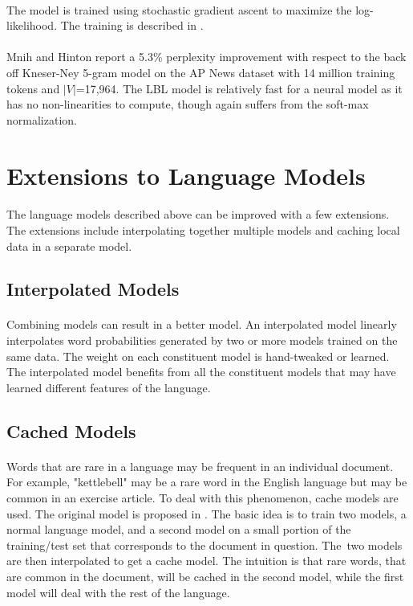 \paragraph{}
The model is trained using stochastic gradient ascent to maximize the log-likelihood. The training is described in \cite{MnihHinton2007}.
\paragraph{}
Mnih and Hinton report a 5.3\% perplexity improvement with respect to the back off Kneser-Ney 5-gram model on the AP News dataset with 14 million training tokens and $|V|$=17,964. The LBL model is relatively fast for a neural model as it has no non-linearities to compute, though again suffers from the soft-max normalization. 

\section {Extensions to Language Models}
\paragraph{}
The language models described above can be improved with a few extensions. The extensions include interpolating together multiple models and caching local data in a separate model.

\subsection{Interpolated Models}
\paragraph{}
Combining models can result in a better model. An interpolated model linearly interpolates word probabilities generated by two or more models trained on the same data. The weight on each constituent model is hand-tweaked or learned. The interpolated model benefits from all the constituent models that may have learned different features of the language.
\subsection{Cached Models}
\paragraph{}
Words that are rare in a language may be frequent in an individual document. For example, "kettlebell" may be a rare word in the English language but may be common in an exercise article. To deal with this phenomenon, cache models are used. The original model is proposed in \cite{Kuhn1990}. The basic idea is to train two models, a normal language model, and a second model on a small portion of the training/test set that corresponds to the document in question. The~two models are then interpolated to get a cache model. The intuition is that rare words, that are common in the document, will be cached in the second model, while the first model will deal with the rest of the language.

